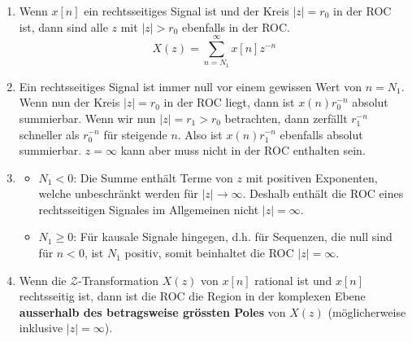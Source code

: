 \documentclass[11pt]{article}
\begin{document}
\begin{itemize}[leftmargin = 0pt]
\begin{enumerate}
\begin{center}
        \end{center}
        \item[] Wenn $x[n]$ ein rechtsseitiges Signal ist und der Kreis $|z|=r_0$ in der ROC ist, dann sind alle $z$ mit $|z|>r_0$ ebenfalls in der ROC.
        $$X(z) = \sum_{n=N_1}^\infty x[n]z^{-n}$$
        \item[] Ein rechtsseitiges Signal ist immer null vor einem gewissen Wert von $n=N_1$. Wenn nun der Kreis $|z|=r_0$ in der ROC liegt, dann ist $x(n)r_0^{-n}$ absolut summierbar. Wenn wir nun $|z|=r_1 > r_0$ betrachten, dann zerfällt $r_1^{-n}$ schneller als $r_0^{-n}$ für steigende $n$. Also ist $x(n)r_1^{-n}$ ebenfalls absolut summierbar. $z = \infty$ kann aber muss nicht in der ROC enthalten sein.
        \item[] \begin{itemize}
            \item $N_1 < 0$: Die Summe enthält Terme von $z$ mit positiven Exponenten, welche unbeschränkt werden für $|z| \to \infty$. Deshalb enthält die ROC eines rechtsseitigen Signales im Allgemeinen nicht $|z|=\infty$.
            \item $N_1 \geq 0$: Für kausale Signale hingegen, d.h. für Sequenzen, die null sind für $n<0$, ist $N_1$ positiv, somit beinhaltet die ROC $|z|=\infty$.
        \end{itemize}
        \item[] Wenn die $\mathcal{Z}$-Transformation $X(z)$ von $x[n]$ rational ist und $x[n]$ rechtsseitig ist, dann ist die ROC die Region in der komplexen Ebene \textbf{ausserhalb des betragsweise grössten Poles} von $X(z)$ (möglicherweise inklusive $|z|=\infty$).
        

\end{enumerate}
\end{itemize}
\end{document}
